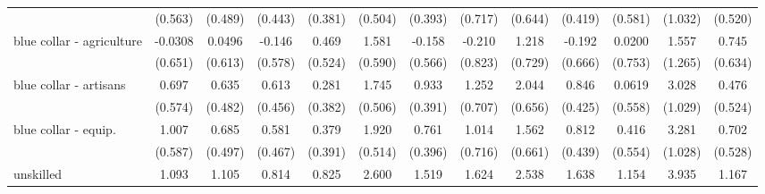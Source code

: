 {\begin{tabular}{l*{12}{c}}
                    &     (0.563)         &     (0.489)         &     (0.443)         &     (0.381)         &     (0.504)         &     (0.393)         &     (0.717)         &     (0.644)         &     (0.419)         &     (0.581)         &     (1.032)         &     (0.520)         \\
[1em]
blue collar - agriculture&     -0.0308         &      0.0496         &      -0.146         &       0.469         &       1.581\sym{**} &      -0.158         &      -0.210         &       1.218         &      -0.192         &      0.0200         &       1.557         &       0.745         \\
                    &     (0.651)         &     (0.613)         &     (0.578)         &     (0.524)         &     (0.590)         &     (0.566)         &     (0.823)         &     (0.729)         &     (0.666)         &     (0.753)         &     (1.265)         &     (0.634)         \\
[1em]
blue collar - artisans&       0.697         &       0.635         &       0.613         &       0.281         &       1.745\sym{***}&       0.933\sym{*}  &       1.252         &       2.044\sym{**} &       0.846\sym{*}  &      0.0619         &       3.028\sym{**} &       0.476         \\
                    &     (0.574)         &     (0.482)         &     (0.456)         &     (0.382)         &     (0.506)         &     (0.391)         &     (0.707)         &     (0.656)         &     (0.425)         &     (0.558)         &     (1.029)         &     (0.524)         \\
[1em]
blue collar - equip.&       1.007         &       0.685         &       0.581         &       0.379         &       1.920\sym{***}&       0.761         &       1.014         &       1.562\sym{*}  &       0.812         &       0.416         &       3.281\sym{**} &       0.702         \\
                    &     (0.587)         &     (0.497)         &     (0.467)         &     (0.391)         &     (0.514)         &     (0.396)         &     (0.716)         &     (0.661)         &     (0.439)         &     (0.554)         &     (1.028)         &     (0.528)         \\
[1em]
unskilled           &       1.093         &       1.105\sym{*}  &       0.814         &       0.825\sym{*}  &       2.600\sym{***}&       1.519\sym{***}&       1.624\sym{*}  &       2.538\sym{***}&       1.638\sym{***}&       1.154\sym{*}  &       3.935\sym{***}&       1.167\sym{*}  \\

\end{tabular}}

